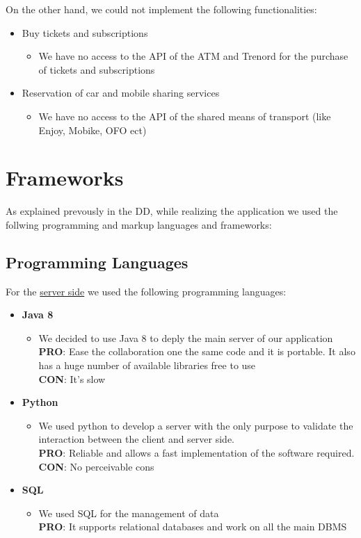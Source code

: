 \documentclass[numbers=noenddot, 12pt, a4paper, oneside]{scrbook}
\begin{document}
On the other hand, we could not implement the following functionalities:
\begin{itemize}
	\item Buy tickets and subscriptions
	\begin{itemize}
		\item We have no access to the API of the ATM and Trenord for the purchase of tickets and subscriptions
	\end{itemize}
	\item Reservation of car and mobile sharing services
	\begin{itemize}
		\item We have no access to the API of the shared means of transport (like Enjoy, Mobike, OFO ect)
	\end{itemize}
\end{itemize}


\chapter{Frameworks}

As explained prevously in the DD, while realizing the application we used the follwing programming and markup languages and frameworks:

\section*{Programming Languages}

For the \underline{server side} we used the following programming languages:
\begin{itemize}
	\item \textbf{Java 8}
	\begin{itemize}
		\item We decided to use Java 8 to deply the main server of our application\\
		\textbf{PRO}: Ease the collaboration one the same code and it is portable. It also has a huge number of available libraries free to use\\ 
		\textbf{CON}: It's slow
	\end{itemize}
	\item \textbf{Python}
	\begin{itemize}
		\item We used python to develop a server with the only purpose to validate the interaction between the client and server side.\\
		\textbf{PRO}: Reliable and allows a fast implementation of the software required.\\
		\textbf{CON}: No perceivable cons
	\end{itemize}
	\item \textbf{SQL}
	\begin{itemize}
		\item We used SQL for the management of data\\
		\textbf{PRO}: It supports relational databases and work on all the main DBMS\\
	\end{itemize}
\end{itemize}
\end{document}
